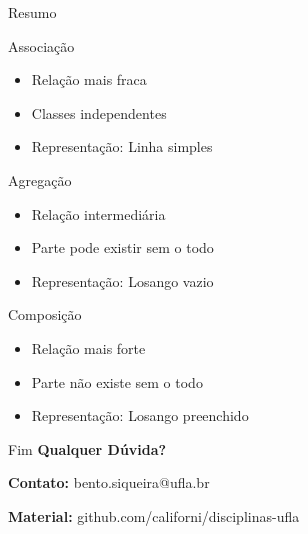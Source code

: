 \documentclass[aspectratio=169]{beamer}
\begin{document}
\begin{frame}{Resumo}
\begin{block}{Associação}
\begin{itemize}
\item Relação mais fraca
\item Classes independentes
\item Representação: Linha simples
\end{itemize}
\end{block}

\begin{block}{Agregação}
\begin{itemize}
\item Relação intermediária
\item Parte pode existir sem o todo
\item Representação: Losango vazio
\end{itemize}
\end{block}

\begin{block}{Composição}
\begin{itemize}
\item Relação mais forte
\item Parte não existe sem o todo
\item Representação: Losango preenchido
\end{itemize}
\end{block}
\end{frame}

\begin{frame}{Fim}
\centering
\Large \textbf{Qualquer Dúvida?}

\vspace{1cm}

\normalsize
\textbf{Contato:} bento.siqueira@ufla.br

\vspace{0.5cm}

\textbf{Material:} github.com/californi/disciplinas-ufla
\end{frame}
\end{document}
